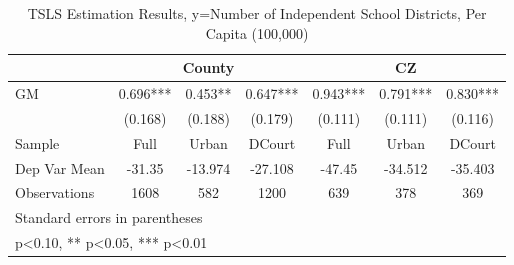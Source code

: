 \begin{table}[htbp]\centering
\def\sym#1{\ifmmode^{#1}\else\(^{#1}\)\fi}
\caption{TSLS Estimation Results, y=Number of Independent School Districts, Per Capita (100,000)}
\begin{tabular}{l*{6}{c}}
\toprule
                &\multicolumn{3}{c}{County}            &\multicolumn{3}{c}{CZ}                \\\cmidrule(lr){2-4}\cmidrule(lr){5-7}
\midrule
GM              &    0.696***&    0.453** &    0.647***&    0.943***&    0.791***&    0.830***\\
                &  (0.168)   &  (0.188)   &  (0.179)   &  (0.111)   &  (0.111)   &  (0.116)   \\
\midrule
Sample          &     Full   &    Urban   &   DCourt   &     Full   &    Urban   &   DCourt   \\
Dep Var Mean    &   -31.35   &  -13.974   &  -27.108   &   -47.45   &  -34.512   &  -35.403   \\
Observations    &     1608   &      582   &     1200   &      639   &      378   &      369   \\
\bottomrule
\multicolumn{7}{l}{\footnotesize Standard errors in parentheses}\\
\multicolumn{7}{l}{\footnotesize * p<0.10, ** p<0.05, *** p<0.01}\\
\end{tabular}
\end{table}
